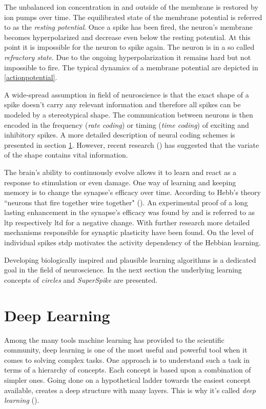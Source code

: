 The unbalanced ion concentration in and outside of the membrane is restored by ion pumps over time. The equilibrated state of the membrane potential is referred to as the \emph{resting potential}. Once a spike has been fired, the neuron's membrane becomes hyperpolarized and decrease even below the resting potential. At this point it is impossible for the neuron to spike again. The neuron is in a so called \emph{refractory state}. Due to the ongoing hyperpolarization it remains hard but not impossible to fire. The typical dynamics of a membrane potential are depicted in \cref{actionpotential}.

A wide-spread assumption in field of neuroscience is that the exact shape of a spike doesn't carry any relevant information and therefore all spikes can be modeled by a stereotypical shape. The communication between neurons is then encoded in the frequency (\emph{rate coding}) or timing (\emph{time coding}) of exciting and inhibitory spikes. A more detailed description of neural coding schemes is presented in section \ref{deeplearning}. However, recent research (\cite{debanne2013mechanisms}) has suggested that the variate of the shape contains vital information.

The brain's ability to continuously evolve allows it to learn and react as a response to stimulation or even damage. One way of learning and keeping memory is to change the synapse's efficacy over time. According to Hebb's theory ``neurons that fire together wire together" (\cite{hebb1949organization}). An experimental proof of a long lasting enhancement in the synapse's efficacy was found by \cite{bliss1973long} and is referred to as \gls{ltp} respectively \gls{ltd} for a negative change. With further research more detailed mechanisms responsible for synaptic plasticity have been found. On the level of individual spikes \gls{stdp} motivates the activity dependency of the Hebbian learning.

Developing biologically inspired and plausible learning algorithms is a dedicated goal in the field of neuroscience. In the next section the underlying learning concepts of \emph{circles} and \emph{SuperSpike} are presented.

\section{Deep Learning}
\label{deeplearning}
Among the many tools machine learning has provided to the scientific community, deep learning is one of the most useful and powerful tool when it comes to solving complex tasks. One approach is to understand such a task in terms of a hierarchy of concepts. Each concept is based upon a combination of simpler ones. Going done on a hypothetical ladder towards the easiest concept available, creates a deep structure with many layers. This is why it's called \textit{deep learning} (\cite{Goodfellow-et-al-2016}).

